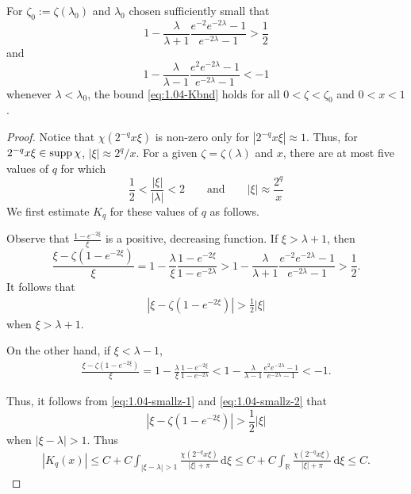 \documentclass[../dissertation.tex]{subfiles}
\begin{document}
\begin{lma}%
	\label{lma:1.04-smallz}
	For $\zeta_0 := \zeta(\lambda_0)$ and $\lambda_0$ chosen suf{}ficiently small that
	\[
		1 - \frac{\lambda}{\lambda+1}\frac{e^{-2}e^{-2\lambda}-1}{e^{-2\lambda}-1} 
			> \frac{1}{2}
	\]
	and
	\[
		1 - \frac{\lambda}{\lambda - 1} \frac{e^2 e^{-2\lambda} -1}{e^{-2\lambda}-1}
			<-1
	\]
	whenever $\lambda < \lambda_0$, the bound \eqref{eq:1.04-Kbnd} holds
	for all $0 < \zeta < \zeta_0$ and $0 < x < 1$. 
\end{lma}
\begin{proof}
	Notice that $\chi\left( 2^{-q} x \xi\right)$ is non-zero only for 
	$\left|2^{-q} x \xi\right| \approx 1$. Thus, for $2^{-q} x \xi \in \operatorname{supp} \chi$,
	$|\xi| \approx 2^{q}/x$. For a given $\zeta = \zeta(\lambda)$ and $x$, there are at most
	five values of $q$ for which 
	\[
		\frac{1}{2} < \frac{|\xi|}{|\lambda|} < 2 
		\qquad \text{and} \qquad |\xi| \approx \frac{2^{q}}{x}
	\]
	We first estimate $K_q$ for these values of $q$ as follows. 

	Observe that $\displaystyle \frac{1-e^{-2\xi}}{\xi}$ is a positive, decreasing function.
	If $\xi > \lambda +1$, then
	\[
		\frac{\xi - \zeta\left(1-e^{-2\xi}\right)}{\xi}
			= 1 - \frac{\lambda}{\xi} \frac{1 - e^{-2\xi}}{1- e^{-2\lambda}} 
			> 1 - \frac{\lambda}{\lambda+1}\frac{e^{-2}e^{-2\lambda}-1}{e^{-2\lambda}-1} 
			> \frac{1}{2}.
	\]
	It follows that 
	\begin{align} \label{eq:1.04-smallz-1}
		\left| \xi - \zeta\left(1 - e^{-2\xi}\right) \right| > \frac{1}{2}|\xi|
	\end{align}
	when $\xi > \lambda +1$. 

	On the other hand, if $\xi < \lambda -1$, 
	\begin{align} \label{eq:1.04-smallz-2}
		\frac{\xi - \zeta\left(1-e^{-2\xi}\right)}{\xi}
			= 1 - \frac{\lambda}{\xi} \frac{1 - e^{-2\xi}}{1- e^{-2\lambda}} 
			< 1 - \frac{\lambda}{\lambda - 1} \frac{e^2 e^{-2\lambda} -1}{e^{-2\lambda}-1}
			<-1.
	\end{align}
	
	Thus, it follows from \eqref{eq:1.04-smallz-1} and \eqref{eq:1.04-smallz-2} that
	\[
		\left| \xi - \zeta\left(1 - e^{-2\xi}\right) \right| > \frac{1}{2}|\xi|
	\]
	when $|\xi - \lambda| > 1$. Thus
	\begin{align}
		\left| K_q(x) \right|
			\leq C + C 
				\int_{|\xi - \lambda| > 1} 
					\frac{\chi(2^{-q} x \xi)}{|\xi| + \pi} 
				\, \mathrm{d}\xi
			\leq C + C 
				\int_{\mathbb R} 
					\frac{\chi(2^{-q} x \xi)}{|\xi| + \pi}
				\, \mathrm{d}\xi
			\leq C.
	\end{align}


\end{proof}
\end{document}

